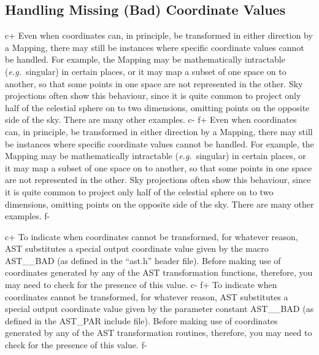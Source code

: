 \documentclass[twoside,11pt]{starlink}
\begin{document}

\subsection{\label{ss:badcoordinates}Handling Missing (Bad) Coordinate Values}

c+
Even when coordinates can, in principle, be transformed in either
direction by a Mapping, there may still be instances where specific
coordinate values cannot be handled. For example, the Mapping may be
mathematically intractable (\emph{e.g.}\ singular) in certain places,
or it may map a subset of one space on to another, so that some points
in one space are not represented in the other.  Sky projections often
show this behaviour, since it is quite common to project only half of
the celestial sphere on to two dimensions, omitting points on the
opposite side of the sky. There are many other examples.
c-
f+
Even when coordinates can, in principle, be transformed in either
direction by a Mapping, there may still be instances where specific
coordinate values cannot be handled. For example, the Mapping may be
mathematically intractable (\emph{e.g.}\ singular) in certain places,
or it may map a subset of one space on to another, so that some points
in one space are not represented in the other.  Sky projections often
show this behaviour, since it is quite common to project only half of
the celestial sphere on to two dimensions, omitting points on the
opposite side of the sky. There are many other examples.
f-

c+
To indicate when coordinates cannot be transformed, for whatever
reason, AST substitutes a special output coordinate value given by the
macro AST\_\_BAD (as defined in the ``ast.h'' header file).  Before
making use of coordinates generated by any of the AST transformation
functions, therefore, you may need to check for the presence of this
value.
c-
f+
To indicate when coordinates cannot be transformed, for whatever
reason, AST substitutes a special output coordinate value given by the
parameter constant AST\_\_BAD (as defined in the AST\_PAR include
file).  Before making use of coordinates generated by any of the AST
transformation routines, therefore, you may need to check for the
presence of this value.
f-
\end{document}
